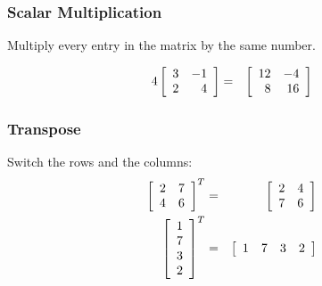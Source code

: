 \begin{frame}
  \frametitle{Scalar Multiplication}

  Multiply every entry in the matrix by the same number.

  \begin{eqnarray*}
    4 \left[ \begin{array}{rr} 3 & -1 \\ 2 & 4 \end{array} \right] & = & \left[ \begin{array}{rr} 12 & -4 \\ 8 & 16 \end{array} \right]
  \end{eqnarray*}


\end{frame}


\begin{frame}
  \frametitle{Transpose}

  Switch the rows and the columns:
  \begin{eqnarray*}
    \left[ \begin{array}{rr} 2 & 7 \\ 4 & 6 \end{array} \right]^T & = & \left[ \begin{array}{rr} 2 & 4 \\ 7 & 6 \end{array} \right] \\
    \left[
    \begin{array}{r}
      1 \\ 7 \\ 3 \\ 2
    \end{array}
    \right]^T & = & 
    \left[
    \begin{array}{rrrr}
      1 & 7 & 3 & 2
    \end{array}
    \right]
  \end{eqnarray*}

\end{frame}


